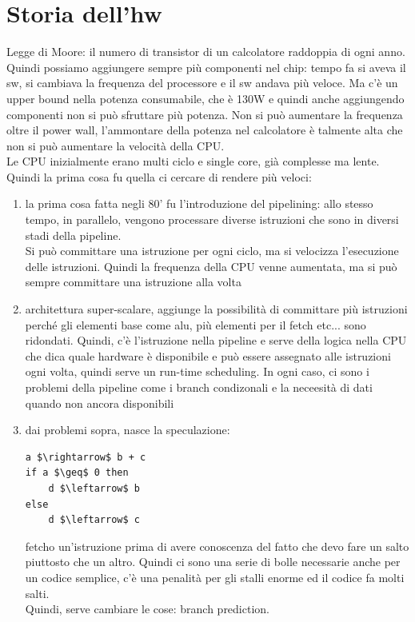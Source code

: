 \documentclass[12pt, oneside]{extbook} %
\begin{document}
\section{Storia dell'hw}
Legge di Moore: il numero di transistor di un calcolatore raddoppia di ogni anno.\\ Quindi possiamo aggiungere sempre più componenti nel chip: tempo fa si aveva il sw, si cambiava la frequenza del processore e il sw andava più veloce. Ma c'è un upper bound nella potenza consumabile, che è 130W e quindi anche aggiungendo componenti non si può sfruttare più potenza. Non si può aumentare la frequenza oltre il power wall, l'ammontare della potenza nel calcolatore è talmente alta che non si può aumentare la velocità della CPU.\\ Le CPU inizialmente erano multi ciclo e single core, già complesse ma lente. Quindi la prima cosa fu quella ci cercare di rendere più veloci:
\begin{enumerate}
\item la prima cosa fatta negli 80' fu l'introduzione del pipelining: allo stesso tempo, in parallelo, vengono processare diverse istruzioni che sono in diversi stadi della pipeline.\\ Si può committare una istruzione per ogni ciclo, ma si velocizza l'esecuzione delle istruzioni. Quindi la frequenza della CPU venne aumentata, ma si può sempre committare una istruzione alla volta
\item architettura super-scalare, aggiunge la possibilità di committare più istruzioni perché gli elementi base come alu, più elementi per il fetch etc... sono ridondati. Quindi, c'è l'istruzione nella pipeline e serve della logica nella CPU che dica quale hardware è disponibile e può essere assegnato alle istruzioni ogni volta, quindi serve un run-time scheduling. In ogni caso, ci sono i problemi della pipeline come i branch condizonali e la neceesità di dati quando non ancora disponibili
\item dai problemi sopra, nasce la speculazione:
\begin{lstlisting}[mathescape=true]
a $\rightarrow$ b + c
if a $\geq$ 0 then
	d $\leftarrow$ b
else
	d $\leftarrow$ c
\end{lstlisting}
fetcho un'istruzione prima di avere conoscenza del fatto che devo fare un salto piuttosto che un altro. Quindi ci sono una serie di bolle necessarie anche per un codice semplice, c'è una penalità per gli stalli enorme ed il codice fa molti salti.\\ Quindi, serve cambiare le cose: branch prediction. 
\end{enumerate}
\end{document}
